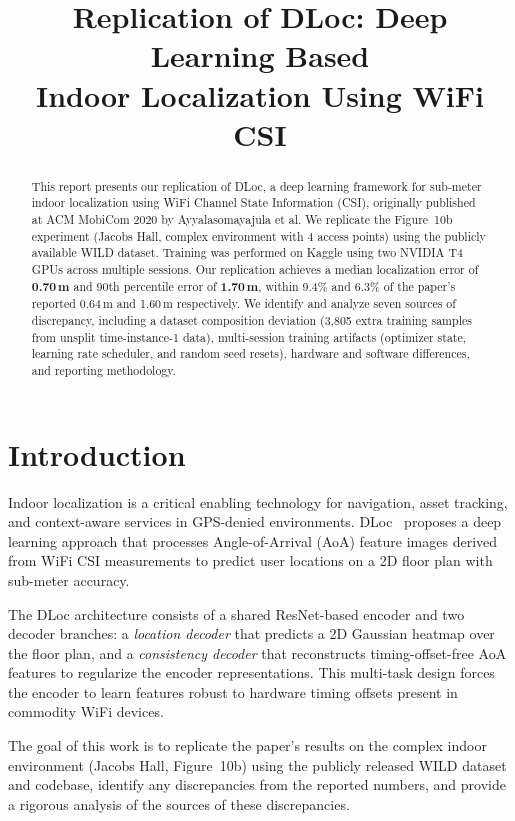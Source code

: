 \documentclass[12pt,a4paper]{article}
\title{Replication of DLoc: Deep Learning Based\\Indoor Localization Using WiFi CSI}
\author{}
\date{}
\begin{document}
\maketitle

\begin{abstract}
This report presents our replication of DLoc, a deep learning framework for sub-meter indoor localization using WiFi Channel State Information (CSI), originally published at ACM MobiCom 2020 by Ayyalasomayajula et al. We replicate the Figure~10b experiment (Jacobs Hall, complex environment with 4 access points) using the publicly available WILD dataset. Training was performed on Kaggle using two NVIDIA T4 GPUs across multiple sessions. Our replication achieves a median localization error of \textbf{0.70\,m} and 90th percentile error of \textbf{1.70\,m}, within 9.4\% and 6.3\% of the paper's reported 0.64\,m and 1.60\,m respectively. We identify and analyze seven sources of discrepancy, including a dataset composition deviation (3{,}805 extra training samples from unsplit time-instance-1 data), multi-session training artifacts (optimizer state, learning rate scheduler, and random seed resets), hardware and software differences, and reporting methodology.
\end{abstract}

\section{Introduction}

Indoor localization is a critical enabling technology for navigation, asset tracking, and context-aware services in GPS-denied environments. DLoc~\cite{dloc2020} proposes a deep learning approach that processes Angle-of-Arrival (AoA) feature images derived from WiFi CSI measurements to predict user locations on a 2D floor plan with sub-meter accuracy.

The DLoc architecture consists of a shared ResNet-based encoder and two decoder branches: a \emph{location decoder} that predicts a 2D Gaussian heatmap over the floor plan, and a \emph{consistency decoder} that reconstructs timing-offset-free AoA features to regularize the encoder representations. This multi-task design forces the encoder to learn features robust to hardware timing offsets present in commodity WiFi devices.

The goal of this work is to replicate the paper's results on the complex indoor environment (Jacobs Hall, Figure~10b) using the publicly released WILD dataset and codebase, identify any discrepancies from the reported numbers, and provide a rigorous analysis of the sources of these discrepancies.
\end{document}
